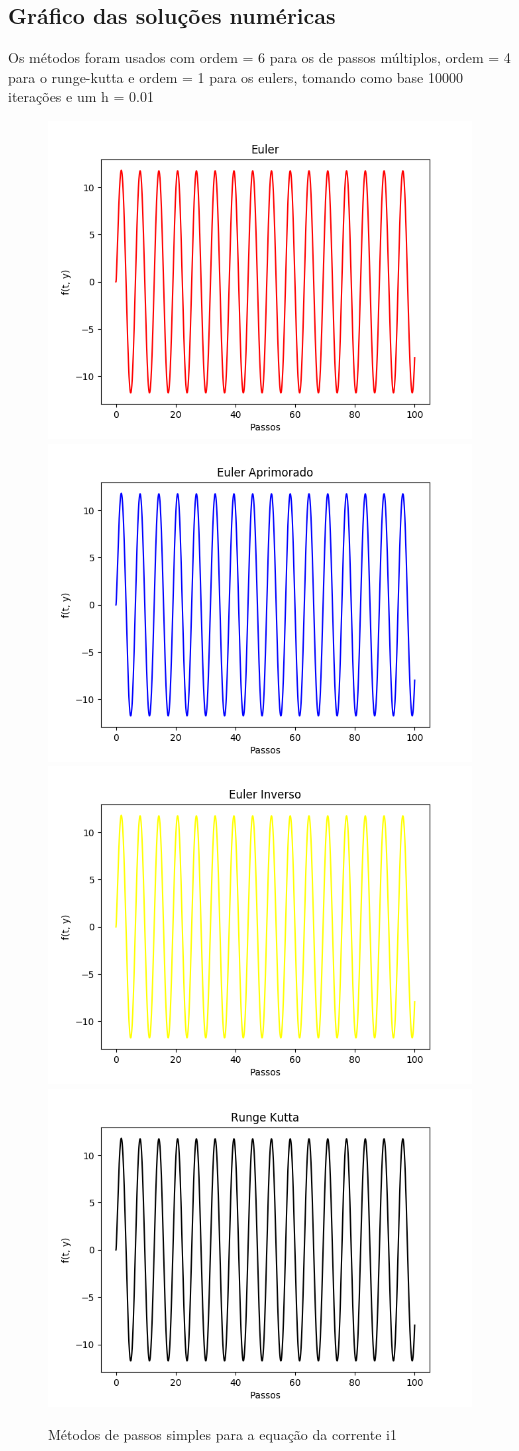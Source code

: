 \documentclass[12pt]{article}%
\begin{document}
    \newpage
    \subsection{Gráfico das soluções numéricas}
    Os métodos foram usados com ordem = 6 para os de passos múltiplos, ordem = 4 para o runge-kutta e ordem = 1 para os eulers, tomando como base 10000 iterações e um h = 0.01
    \begin{figure}[H]
        \begin{center}
            \includegraphics[width=.4\textwidth]{problemas/metodos_q3/circuito_euler.png}
            \includegraphics[width=.4\textwidth]{problemas/metodos_q3/circuito_euler_aprimorado.png}
            \includegraphics[width=.4\textwidth]{problemas/metodos_q3/circuito_euler_inverso.png}
            \includegraphics[width=.4\textwidth]{problemas/metodos_q3/circuito_runge_kutta.png}
        \end{center}
        \caption{Métodos de passos simples para a equação da corrente i1}
    \end{figure}
\end{document}
